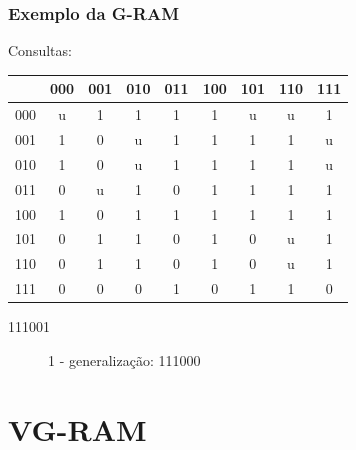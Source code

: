 \documentclass{beamer}
\begin{document}
\begin{frame}
    \frametitle{Exemplo da G-RAM}
    Consultas:

    \begin{table}
        \centering
        \begin{tabular}{|c|c|c|c|c|c|c|c|c|}
            \hline
                &       000 &       001 &       010 &       011 &       100 &       101 &       110 &       111\\
            \hline
            000 &        u  &        1  &        1  &        1  &        1  &        u  &        u  & \alert 1 \\
            \hline
            001 &        1  &        0  &        u  &        1  &        1  &        1  &        1  & \alert u \\
            \hline
            010 &        1  &        0  &        u  &        1  &        1  &        1  &        1  &        u \\
            \hline
            011 &        0  &        u  &        1  &        0  &        1  &        1  &        1  &        1 \\
            \hline
            100 &        1  &        0  &        1  &        1  &        1  &        1  &        1  &        1 \\
            \hline
            101 &        0  &        1  &        1  &        0  &        1  &        0  &        u  &        1 \\
            \hline
            110 &        0  &        1  &        1  &        0  &        1  &        0  &        u  &        1 \\
            \hline
            111 &        0  &        0  &        0  &        1  &        0  &        1  &        1  &        0 \\
            \hline
        \end{tabular}
    \end{table}
    \begin{description}
        \item[111001] 1 - generalização: 111000
    \end{description}
\end{frame}
\section{VG-RAM}
\end{document}
